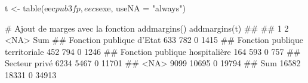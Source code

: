\documentclass[12pt,twosided, notitlepage]{book}
\newenvironment{Shaded}{}{}
\newcommand{\KeywordTok}[1]{\textcolor[rgb]{0.00,0.00,1.00}{#1}}
\newcommand{\DataTypeTok}[1]{#1}
\newcommand{\StringTok}[1]{\textcolor[rgb]{0.00,0.50,0.50}{#1}}
\newcommand{\CommentTok}[1]{\textcolor[rgb]{0.00,0.50,0.00}{#1}}
\newcommand{\OperatorTok}[1]{#1}
\newcommand{\NormalTok}[1]{#1}
\renewenvironment{Shaded}{\begin{snugshade}}{\end{snugshade}}
\begin{document}
\begin{Shaded}
\begin{Highlighting}[]
\NormalTok{t <-}\StringTok{ }\KeywordTok{table}\NormalTok{(eec}\OperatorTok{$}\NormalTok{pub3fp, eec}\OperatorTok{$}\NormalTok{sexe, }\DataTypeTok{useNA =} \StringTok{"always"}\NormalTok{)}

\CommentTok{# Ajout de marges avec la fonction addmargins()}
\KeywordTok{addmargins}\NormalTok{(t)}
\NormalTok{  ##                                 }
\NormalTok{  ##                                      1     2  <NA>   Sum}
\NormalTok{  ##   Fonction publique d'Etat         633   782     0  1415}
\NormalTok{  ##   Fonction publique territoriale   452   794     0  1246}
\NormalTok{  ##   Fonction publique hospitalière   164   593     0   757}
\NormalTok{  ##   Secteur privé                   6234  5467     0 11701}
\NormalTok{  ##   <NA>                            9099 10695     0 19794}
\NormalTok{  ##   Sum                            16582 18331     0 34913}


\end{Highlighting}
\end{Shaded}
\end{document}
